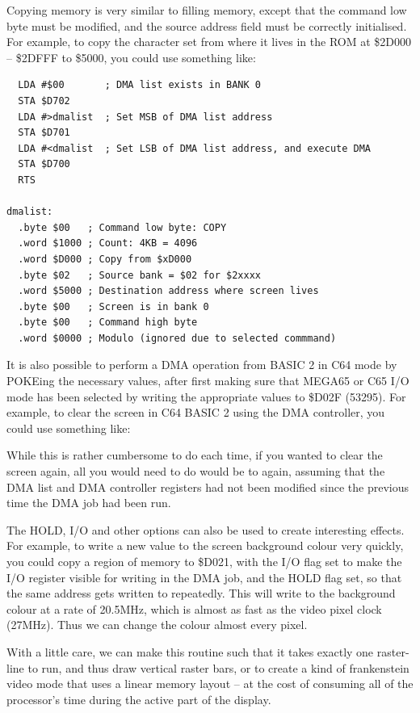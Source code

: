 Copying memory is very similar to filling memory, except that the command
low byte must be modified, and the source address field must be correctly initialised.
For example, to copy the character set from where it lives in the ROM at \$2D000 -- \$2DFFF
to \$5000, you could use something like:

\begin{tcolorbox}[colback=black,coltext=white]
\verbatimfont{\codefont}
\begin{verbatim}
  LDA #$00       ; DMA list exists in BANK 0
  STA $D702
  LDA #>dmalist  ; Set MSB of DMA list address
  STA $D701
  LDA #<dmalist  ; Set LSB of DMA list address, and execute DMA
  STA $D700
  RTS

dmalist:
  .byte $00   ; Command low byte: COPY
  .word $1000 ; Count: 4KB = 4096
  .word $D000 ; Copy from $xD000
  .byte $02   ; Source bank = $02 for $2xxxx
  .word $5000 ; Destination address where screen lives
  .byte $00   ; Screen is in bank 0
  .byte $00   ; Command high byte
  .word $0000 ; Modulo (ignored due to selected commmand)
\end{verbatim}
\end{tcolorbox}

It is also possible to perform a DMA operation from BASIC 2 in C64
mode by POKEing the necessary values, after first making sure that
MEGA65 or C65 I/O mode has been selected by writing the appropriate
values to \$D02F (53295). For example, to clear the screen in C64 BASIC 2
using the DMA controller, you could use something like:



While this is rather cumbersome to do each time, if you wanted to clear
the screen again, all you would need to do would be to  again,
assuming that the DMA list and DMA controller registers had not been modified
since the previous time the DMA job had been run.

The HOLD, I/O and other options can also be used to create interesting effects.
For example, to write a new value to the screen background colour very quickly,
you could copy a region of memory to \$D021, with the I/O flag set to make the I/O
register visible for writing in the DMA job, and the HOLD flag set, so that the
same address gets written to repeatedly. This will write to the background colour
at a rate of 20.5MHz, which is almost as fast as the video pixel clock (27MHz).
Thus we can change the colour almost every pixel.

With a little care, we can make this routine such that it takes exactly one raster-line
to run, and thus draw vertical raster bars, or to create a kind of frankenstein video mode
that uses a linear memory layout -- at the cost of consuming all of the processor's time
during the active part of the display.

